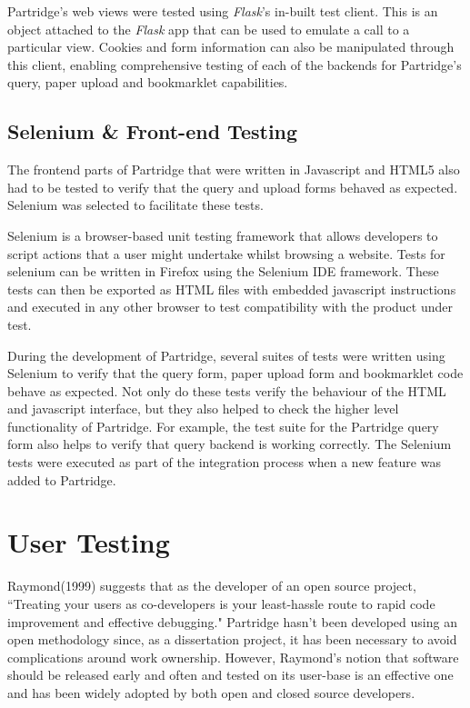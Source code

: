Partridge's web views were tested using \emph{Flask}'s in-built test client.
This is an object attached to the \emph{Flask} app that can be used to emulate
a call to a particular view\cite{flask2012}. Cookies and form information can also be
manipulated through this client, enabling comprehensive testing of each of the backends
for Partridge's query, paper upload and bookmarklet capabilities.


\subsection{ Selenium \& Front-end Testing }

The frontend parts of Partridge that were written in Javascript and HTML5 also
had to be tested to verify that the query and upload forms behaved as expected.
Selenium\cite{seleniumide} was selected to facilitate these tests.

Selenium is a browser-based unit testing framework that allows developers to
script actions that a user might undertake whilst browsing a website. Tests for
selenium can be written in Firefox using the Selenium IDE framework. These
tests can then be exported as HTML files with embedded javascript instructions
and executed in any other browser to test compatibility with the product under
test.

During the development of Partridge, several suites of tests were written using
Selenium to verify that the query form, paper upload form and bookmarklet code
behave as expected. Not only do these tests verify the behaviour of the HTML
and javascript interface, but they also helped to check the higher level
functionality of Partridge. For example, the test suite for the Partridge query
form also helps to verify that query backend is working correctly. The Selenium
tests were executed as part of the integration process when a new feature was
added to Partridge.


\section{ User Testing } 

Raymond(1999) suggests that as the developer of an open source project,
``Treating your users as co-developers is your least-hassle route to rapid code
improvement and effective debugging\cite{raymond1999cathedral}." Partridge
hasn't been developed using an open methodology since, as a dissertation
project, it has been necessary to avoid complications around work ownership.
However, Raymond's notion that software should be released early and often and
tested on its user-base is an effective one and has been widely adopted by both
open and closed source developers\cite{linux2013}\cite{unity2013}.

